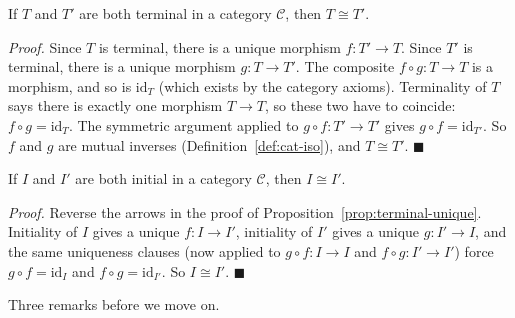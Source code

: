 \begin{proposition}\label{prop:terminal-unique}
If $T$ and $T'$ are both terminal in a category $\mathcal{C}$, then
$T \cong T'$.

\begin{center}
\end{center}

\noindent \textit{Proof.} Since $T$ is terminal, there is a unique
morphism $f : T' \to T$. Since $T'$ is terminal, there is a unique
morphism $g : T \to T'$. The composite $f \circ g : T \to T$ is a
morphism, and so is $\mathrm{id}_T$ (which exists by the category
axioms). Terminality of $T$ says there is exactly one morphism
$T \to T$, so these two have to coincide:
$f \circ g = \mathrm{id}_T$. The symmetric argument applied to
$g \circ f : T' \to T'$ gives $g \circ f = \mathrm{id}_{T'}$. So $f$
and $g$ are mutual inverses (Definition~\ref{def:cat-iso}), and
$T \cong T'$. $\blacksquare$
\end{proposition}
\newpage
\begin{corollary}\label{cor:initial-unique}
If $I$ and $I'$ are both initial in a category $\mathcal{C}$, then
$I \cong I'$.

\begin{center}
\end{center}

\noindent \textit{Proof.} Reverse the arrows in the proof of
Proposition~\ref{prop:terminal-unique}. Initiality of $I$ gives a
unique $f : I \to I'$, initiality of $I'$ gives a unique $g : I' \to I$,
and the same uniqueness clauses (now applied to $g \circ f : I \to I$
and $f \circ g : I' \to I'$) force $g \circ f = \mathrm{id}_I$ and
$f \circ g = \mathrm{id}_{I'}$. So $I \cong I'$. $\blacksquare$
\end{corollary}

\noindent Three remarks before we move on.

